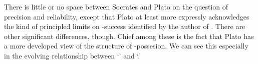 \documentclass[11pt,letterpaper,oneside]{amsart} %
\begin{document}






















There is little or no space between Socrates and Plato on the question of precision and reliability, except that Plato at least more expressly acknowledges the kind of principled limits on \techne-success identified by the author of . There are other significant differences, though. Chief among these is the fact that Plato has a more developed view of the structure of \techne-possesion. We can see this especially in the evolving relationship between `\techne' and `\episteme.'
\end{document}
